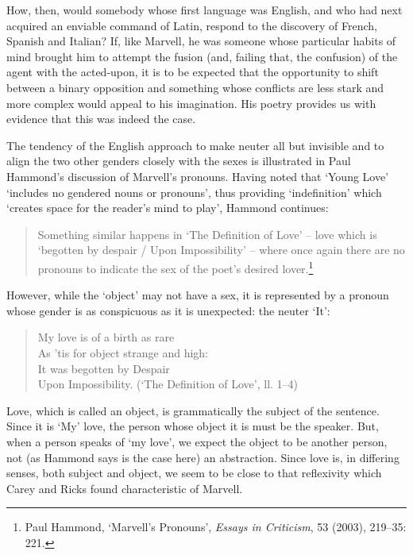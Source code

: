 ﻿\documentclass[12pt]{article}
\newcommand{\citedtitle}[1]{\textit{#1}}
\begin{document}
How,
then, would somebody whose first language was English, and who had next
acquired an enviable command of Latin, respond to the discovery of French,
Spanish and Italian? If, like Marvell, he was someone whose particular habits
of mind brought him to attempt the fusion (and, failing that, the confusion) of
the agent with the acted-upon, it is to be expected that the opportunity to
shift between a binary opposition and something whose conflicts are less stark and more complex would appeal to his imagination. His poetry provides us with
evidence that this was indeed the case.

The
tendency of the English approach to make neuter all but invisible and to align
the two other genders closely with the sexes is illustrated in Paul Hammond’s
discussion of Marvell’s pronouns. Having noted that ‘Young Love’ ‘includes no
gendered nouns or pronouns’, thus providing ‘indefinition’ which ‘creates space
for the reader’s mind to play’, Hammond continues:

\begin{quote}
Something
similar happens in ‘The Definition of Love’ – love which is ‘begotten by
despair / Upon Impossibility’ – where once again there are no pronouns to
indicate the sex of the poet’s desired lover.\footnote{Paul Hammond,
‘Marvell’s Pronouns’, \citedtitle{Essays in Criticism}, 53 (2003), 219–35:
221.}
\end{quote}
However, while the ‘object’ may not have a sex, it is represented by a pronoun whose
gender is as conspicuous as it is unexpected: the neuter ‘It’:

\begin{verse}My
love is of a birth as rare\\
As ’tis for object strange and high:\\
It was begotten by Despair\\
Upon Impossibility. (‘The Definition of Love’, ll. 1–4)
\end{verse}
Love, which is called an object, is grammatically the subject of the sentence. Since
it is ‘My’ love, the person whose object it is must be the speaker. But, when a
person speaks of ‘my love’, we expect the object to be another person, not (as
Hammond says is the case here) an abstraction. Since love is, in differing
senses, both subject and object, we seem to be close to that reflexivity which
Carey and Ricks found characteristic of Marvell.
\end{document}
